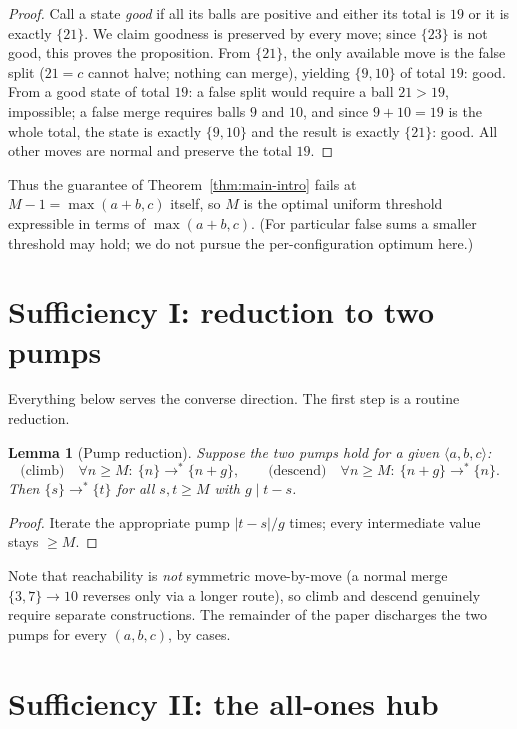 \documentclass[11pt]{article}
\newtheorem{lemma}[theorem]{Lemma}
\theoremstyle{definition}
\theoremstyle{remark}
\newcommand{\lie}[3]{\langle #1,#2,#3\rangle}
\newcommand{\ms}[1]{\{#1\}}
\newcommand{\reach}{\longrightarrow^{*}}
\begin{document}
\begin{proof}
Call a state \emph{good} if all its balls are positive and either its total
is $19$ or it is exactly $\ms{21}$.  We claim goodness is preserved by every
move; since $\ms{23}$ is not good, this proves the proposition.  From
$\ms{21}$, the only available move is the false split ($21=c$ cannot halve;
nothing can merge), yielding $\ms{9,10}$ of total $19$: good.  From a good
state of total $19$: a false split would require a ball $21>19$, impossible;
a false merge requires balls $9$ and $10$, and since $9+10=19$ is the whole
total, the state is exactly $\ms{9,10}$ and the result is exactly
$\ms{21}$: good.  All other moves are normal and preserve the total $19$.
\end{proof}

Thus the guarantee of Theorem~\ref{thm:main-intro} fails at $M-1=\max(a+b,c)$
itself, so $M$ is the optimal uniform threshold expressible in terms of
$\max(a+b,c)$.  (For particular false sums a smaller threshold may hold; we do
not pursue the per-configuration optimum here.)

\section{Sufficiency I: reduction to two pumps}\label{sec:pumps}

Everything below serves the converse direction.  The first step is a
routine reduction.

\begin{lemma}[Pump reduction]\label{lem:pumps}
Suppose the two \emph{pumps} hold for a given $\lie{a}{b}{c}$:
\[
\text{(climb)}\quad \forall n\ge M:\ \ms{n}\reach\ms{n+g},
\qquad
\text{(descend)}\quad \forall n\ge M:\ \ms{n+g}\reach\ms{n}.
\]
Then $\ms{s}\reach\ms{t}$ for all $s,t\ge M$ with $g\mid t-s$.
\end{lemma}

\begin{proof}
Iterate the appropriate pump $|t-s|/g$ times; every intermediate value stays
$\ge M$.
\end{proof}

Note that reachability is \emph{not} symmetric move-by-move (a normal merge
$\{3,7\}\to 10$ reverses only via a longer route), so climb and descend
genuinely require separate constructions.  The remainder of the paper
discharges the two pumps for every $(a,b,c)$, by cases.

\section{Sufficiency II: the all-ones hub}\label{sec:hub}
\end{document}

